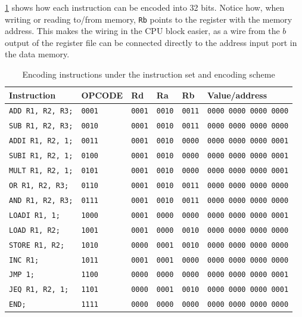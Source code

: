 \documentclass[a4paper, english]{article}
\numberwithin{equation}{section}
\begin{document}
\cref{tbl:encex} shows how each instruction can be encoded into 32 bits. Notice how, when writing or reading to/from memory, \texttt{Rb} points to the register with the memory address. This makes the wiring in the CPU block easier, as a wire from the \(b\) output of the register file can be connected directly to the address input port in the data memory.
\begin{table}
    \centering
    \caption{Encoding instructions under the instruction set and encoding scheme}\label{tbl:encex}
    \begin{tabular}{llllll}
        \toprule
        \textbf{Instruction}     & OPCODE        & Rd            & Ra            & Rb            & Value/address                \\
        \midrule
        \texttt{ADD R1, R2, R3;} & \texttt{0001} & \texttt{0001} & \texttt{0010} & \texttt{0011} & \texttt{0000 0000 0000 0000} \\
        \texttt{SUB R1, R2, R3;} & \texttt{0010} & \texttt{0001} & \texttt{0010} & \texttt{0011} & \texttt{0000 0000 0000 0000} \\
        \texttt{ADDI R1, R2, 1;} & \texttt{0011} & \texttt{0001} & \texttt{0010} & \texttt{0000} & \texttt{0000 0000 0000 0001} \\
        \texttt{SUBI R1, R2, 1;} & \texttt{0100} & \texttt{0001} & \texttt{0010} & \texttt{0000} & \texttt{0000 0000 0000 0001} \\
        \texttt{MULT R1, R2, 1;} & \texttt{0101} & \texttt{0001} & \texttt{0010} & \texttt{0000} & \texttt{0000 0000 0000 0001} \\
        \texttt{OR R1, R2, R3;}  & \texttt{0110} & \texttt{0001} & \texttt{0010} & \texttt{0011} & \texttt{0000 0000 0000 0000} \\
        \texttt{AND R1, R2, R3;} & \texttt{0111} & \texttt{0001} & \texttt{0010} & \texttt{0011} & \texttt{0000 0000 0000 0000} \\
        \texttt{LOADI R1, 1;}    & \texttt{1000} & \texttt{0001} & \texttt{0000} & \texttt{0000} & \texttt{0000 0000 0000 0001} \\
        \texttt{LOAD R1, R2;}    & \texttt{1001} & \texttt{0001} & \texttt{0000} & \texttt{0010} & \texttt{0000 0000 0000 0000} \\
        \texttt{STORE R1, R2;}   & \texttt{1010} & \texttt{0000} & \texttt{0001} & \texttt{0010} & \texttt{0000 0000 0000 0000} \\
        \texttt{INC R1;}         & \texttt{1011} & \texttt{0001} & \texttt{0001} & \texttt{0000} & \texttt{0000 0000 0000 0000} \\
        \texttt{JMP 1;}          & \texttt{1100} & \texttt{0000} & \texttt{0000} & \texttt{0000} & \texttt{0000 0000 0000 0001} \\
        \texttt{JEQ R1, R2, 1;}  & \texttt{1101} & \texttt{0000} & \texttt{0001} & \texttt{0010} & \texttt{0000 0000 0000 0001} \\
        \texttt{END;}            & \texttt{1111} & \texttt{0000} & \texttt{0000} & \texttt{0000} & \texttt{0000 0000 0000 0000} \\
        \bottomrule
    \end{tabular}
\end{table}
\end{document}
